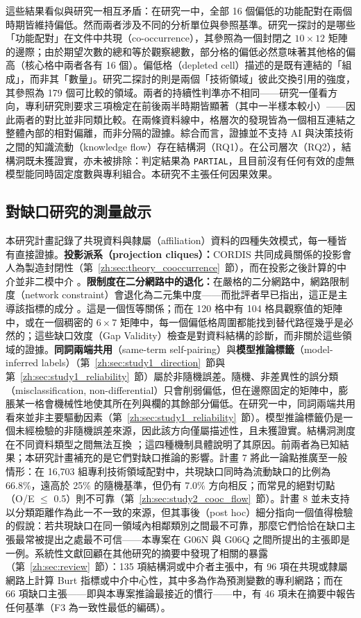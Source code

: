 這些結果看似與研究一相互矛盾：在研究一中，全部 16 個偏低的功能配對在兩個時期皆維持偏低。然而兩者涉及不同的分析單位與參照基準。研究一探討的是哪些「功能配對」在文件中共現（co-occurrence），其參照為一個封閉之 $10\times12$ 矩陣的邊際；由於期望次數的總和等於觀察總數，部分格的偏低必然意味著其他格的偏高（核心格中兩者各有 16 個）。偏低格（depleted cell）描述的是既有連結的「組成」，而非其「數量」。研究二探討的則是兩個「技術領域」彼此交換引用的強度，其參照為 179 個可比較的領域。兩者的持續性判準亦不相同——研究一僅看方向，專利研究則要求三項檢定在前後兩半時期皆顯著（其中一半樣本較小）——因此兩者的對比並非同類比較。在兩條資料線中，格層次的發現皆為一個相互連結之整體內部的相對偏離，而非分隔的證據。綜合而言，證據並不支持 AI 與決策技術之間的知識流動（knowledge flow）存在結構洞（RQ1）。在公司層次（RQ2），結構洞既未獲證實，亦未被排除：判定結果為 \texttt{PARTIAL}，且目前沒有任何有效的虛無模型能同時固定度數與專利組合。本研究不主張任何因果效果。

\subsection{對缺口研究的測量啟示}
\label{zh:sec:discussion_measurement}

本研究計畫記錄了共現資料與隸屬（affiliation）資料的四種失效模式，每一種皆有直接證據。\textbf{投影派系（projection cliques）：}CORDIS 共同成員關係的投影會人為製造封閉性（第~\ref{zh:sec:theory_cooccurrence}~節），而在投影之後計算的中介並非二模中介 \citep{jasny2015two}。\textbf{限制度在二分網路中的退化：}在嚴格的二分網路中，網路限制度（network constraint）會退化為二元集中度——而批評者早已指出，這正是主導該指標的成分 \citep{everett2020unpacking,johnson2026reassessing}。這是一個恆等關係；而在 120 格中有 104 格具觀察值的矩陣中，或在一個稠密的 $6\times7$ 矩陣中，每一個偏低格周圍都能找到替代路徑幾乎是必然的；這些缺口效度（Gap Validity）檢查是對資料結構的診斷，而非關於這些領域的證據。\textbf{同詞兩端共用}（same-term self-pairing）與\textbf{模型推論標籤}（model-inferred labels）（第~\ref{zh:sec:study1_direction}~節與第~\ref{zh:sec:study1_reliability}~節）屬於非隨機誤差。隨機、非差異性的誤分類（misclassification, non-differential）只會削弱偏低，但在邊際固定的矩陣中，膨脹某一格會機械性地使其所在列與欄的其餘部分偏低。在研究一中，同詞兩端共用看來並非主要驅動因素（第~\ref{zh:sec:study1_reliability}~節）。模型推論標籤仍是一個未經檢驗的非隨機誤差來源，因此該方向僅屬描述性，且未獲證實。結構洞測度在不同資料類型之間無法互換 \citep{saglietto2020research}；這四種機制具體說明了其原因。前兩者為已知結果；本研究計畫補充的是它們對缺口推論的影響。計畫 7 將此一論點推廣至一般情形：在 16,703 組專利技術領域配對中，共現缺口同時為流動缺口的比例為 66.8\%，遠高於 25\% 的隨機基準，但仍有 7.0\% 方向相反；而常見的絕對切點（O/E $\leq$ 0.5）則不可靠（第~\ref{zh:sec:study2_cooc_flow}~節）。計畫 8 並未支持以分類距離作為此一不一致的來源，但其事後（post hoc）細分指向一個值得檢驗的假說：若共現缺口在同一領域內相鄰類別之間最不可靠，那麼它們恰恰在缺口主張最常被提出之處最不可信——本專案在 G06N 與 G06Q 之間所提出的主張即是一例。系統性文獻回顧在其他研究的摘要中發現了相關的暴露（第~\ref{zh:sec:review}~節）：135 項結構洞或中介者主張中，有 96 項在共現或隸屬網路上計算 Burt 指標或中介中心性，其中多為作為預測變數的專利網路；而在 66 項缺口主張——即與本專案推論最接近的慣行——中，有 46 項未在摘要中報告任何基準（F3 為一致性最低的編碼）。

